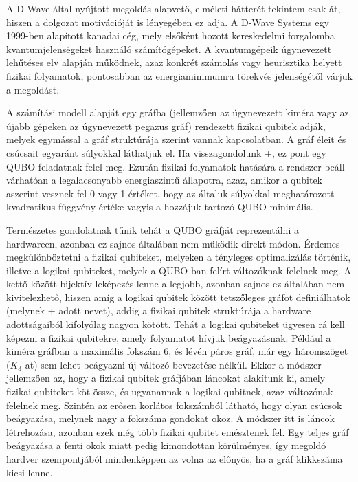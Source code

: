 A D-Wave által nyújtott megoldás alapvető, elméleti hátterét tekintem csak át, hiszen a dolgozat motivációját is lényegében ez adja. A D-Wave Systems egy 1999-ben alapított kanadai cég, mely elsőként hozott kereskedelmi forgalomba kvantumjelenségeket használó számítógépeket. A kvantumgépeik úgynevezett lehűtéses elv alapján működnek, azaz konkrét számolás vagy heurisztika helyett fizikai folyamatok, pontosabban az energiaminimumra törekvés jelenségétől várjuk a megoldást. \cite{Szabo}

A számítási modell alapját egy gráfba (jellemzően az úgynevezett kiméra vagy az újabb gépeken az úgynevezett pegazus gráf) rendezett fizikai qubitek adják, melyek  egymással a gráf struktúrája szerint vannak kapcsolatban. A gráf éleit és csúcsait egyaránt súlyokkal láthatjuk el. Ha visszagondolunk \az+, ez pont egy QUBO feladatnak felel meg. Ezután fizikai folyamatok hatására a rendszer beáll várhatóan a legalacsonyabb energiaszintű állapotra, azaz, amikor a qubitek aszerint vesznek fel 0 vagy 1 értéket, hogy az általuk súlyokkal meghatározott kvadratikus függvény értéke vagyis a hozzájuk tartozó QUBO minimális.

Természetes gondolatnak tűnik tehát a QUBO gráfját reprezentálni a hardwareen, azonban ez sajnos általában nem működik direkt módon.
Érdemes megkülönböztetni a fizikai qubiteket, melyeken a tényleges optimalizálás történik, illetve a logikai qubiteket, melyek a QUBO-ban felírt változóknak felelnek meg. A kettő között bijektív leképezés lenne a legjobb, azonban sajnos ez általában nem kivitelezhető, hiszen amíg a logikai qubitek között tetszőleges gráfot definiálhatok (melynek \az+ adott nevet), addig a fizikai qubitek struktúrája a hardware adottságaiból kifolyólag nagyon kötött. Tehát a logikai qubiteket ügyesen rá kell képezni a fizikai qubitekre, amely folyamatot hívjuk beágyazásnak.
Például a kiméra gráfban a maximális fokszám 6, és lévén páros gráf, már egy háromszöget ($K_3$-at) sem lehet beágyazni új változó bevezetése nélkül. Ekkor a módszer jellemzően az, hogy a fizikai qubitek gráfjában láncokat alakítunk ki, amely fizikai qubiteket köt össze, és ugyanannak a logikai qubitnek, azaz változónak felelnek meg. Szintén az erősen korlátos fokszámból látható, hogy olyan csúcsok beágyazása, melynek nagy a fokszáma gondokat okoz. A módszer itt is láncok létrehozása, azonban ezek még több fizikai qubitet emésztenek fel. Egy teljes gráf beágyazása a fenti okok miatt pedig kimondottan körülményes, így megoldó hardver szempontjából mindenképpen az volna az előnyös, ha a gráf klikkszáma kicsi lenne.

